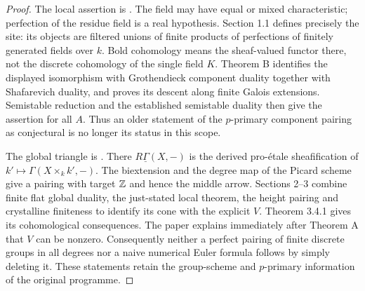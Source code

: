 \begin{proof}
The local assertion is \cite[Theorems A and C, pp.~3--4]{BSuzuki2014}.
The field may have equal or mixed characteristic; perfection of the
residue field is a real hypothesis. Section 1.1 defines precisely the
site: its objects are filtered unions of finite products of perfections
of finitely generated fields over $k$. Bold cohomology means the
sheaf-valued functor there, not the discrete cohomology of the single
field $K$. Theorem B identifies the displayed isomorphism with
Grothendieck component duality together with Shafarevich duality, and
proves its descent along finite Galois extensions. Semistable reduction
and the established semistable duality then give the assertion for
all $A$. Thus an older statement of the $p$-primary component pairing
as conjectural is no longer its status in this scope.

The global triangle is \cite[Theorem A, Section 1.2, p.~3]{BSuzuki2020}.
There $R\underline{\Gamma}(X,-)$ is the derived pro-\'etale
sheafification of $k'\mapsto\Gamma(X\times_k k',-)$. The
biextension and the degree map of the Picard scheme give a pairing
with target ${\mathbb{Z}}$ and hence the middle arrow. Sections 2--3 combine
finite flat global duality, the just-stated local theorem, the height
pairing and crystalline finiteness to identify its cone with the
explicit $V$. Theorem 3.4.1 gives its cohomological consequences.
The paper explains immediately after Theorem A that $V$ can be
nonzero. Consequently neither a perfect pairing of finite discrete
groups in all degrees nor a naive numerical Euler formula follows
by simply deleting it. These statements retain the group-scheme and
$p$-primary information of the original programme.
\end{proof}


